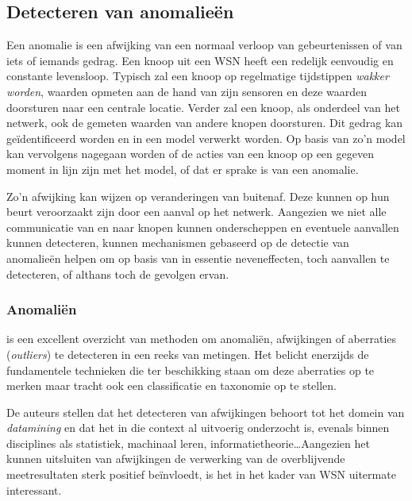
\subsection{Detecteren van anomalie\"en}
\label{subsection:anomaly}

Een anomalie is een afwijking van een normaal verloop van gebeurtenissen of van
iets of iemands gedrag. Een knoop uit een WSN heeft een redelijk eenvoudig en
constante levensloop. Typisch zal een knoop op regelmatige tijdstippen
\emph{wakker worden}, waarden opmeten aan de hand van zijn sensoren en deze
waarden doorsturen naar een centrale locatie. Verder zal een knoop, als
onderdeel van het netwerk, ook de gemeten waarden van andere knopen doorsturen.
Dit gedrag kan ge\"identificeerd worden en in een model verwerkt worden. Op
basis van zo'n model kan vervolgens nagegaan worden of de acties van een knoop
op een gegeven moment in lijn zijn met het model, of dat er sprake is van een
anomalie.

Zo'n afwijking kan wijzen op veranderingen van buitenaf. Deze kunnen op hun
beurt veroorzaakt zijn door een aanval op het netwerk. Aangezien we niet alle
communicatie van en naar knopen kunnen onderscheppen en eventuele aanvallen
kunnen detecteren, kunnen mechanismen gebaseerd op de detectie van anomalie\"en
helpen om op basis van in essentie neveneffecten, toch aanvallen te detecteren,
of althans toch de gevolgen ervan.

\subsubsection*{Anomali\"en}
\label{subsubsection:outlier}

\citep{zhang2010outlier} is een excellent overzicht van methoden om
anomali\"en, afwijkingen of aberraties (\emph{outliers}) te detecteren in een
reeks van metingen. Het belicht enerzijds de fundamentele technieken die ter
beschikking staan om deze aberraties op te merken maar tracht ook een
classificatie en taxonomie op te stellen.

De auteurs stellen dat het detecteren van afwijkingen behoort tot het domein
van \emph{datamining} en dat het in die context al uitvoerig onderzocht is,
evenals binnen disciplines als statistiek, machinaal leren,
informatietheorie\dots Aangezien het kunnen uitsluiten van afwijkingen de
verwerking van de overblijvende meetresultaten sterk positief be\"invloedt, is
het in het kader van WSN uitermate interessant.

